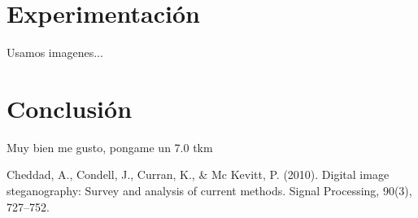 \documentclass{article}
\begin{document}
	
\section*{Experimentación}
	Usamos imagenes...

\section*{Conclusión}
	Muy bien me gusto, pongame un 7.0 tkm

\begin{thebibliography}{99}
 Cheddad, A., Condell, J., Curran, K., & Mc Kevitt, P. (2010). Digital image steganography: Survey and analysis of current methods. Signal Processing, 90(3), 727–752. 


\end{thebibliography}
\end{document}
